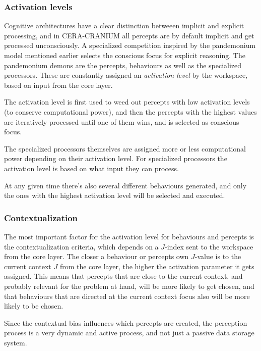 \subsubsection{Activation levels}
Cognitive architectures have a clear distinction betweeen implicit and explicit
processing\cite{atkinson2000consciousness}, and in CERA-CRANIUM all percepts
are by default implicit and get processed unconsciously. A specialized
competition inspired by the pandemonium model mentioned earlier selects the
conscious focus for explicit reasoning. The pandemonium demons are the
percepts, behaviours as well as the specialized processors. These are
constantly assigned an \textit{activation level} by the workspace, based on
input from the core layer.

The activation level is first used to weed out percepts with low activation
levels (to conserve computational power), and then the percepts with the highest
values are iteratively processed until one of them wins, and is selected as
conscious focus.

The specialized processors themselves are assigned more or less computational
power depending on their activation level. For specialized processors the
activation level is based on what input they can process.

At any given time there's also several different behaviours generated, and only
the ones with the highest activation level will be selected and executed.

\subsubsection{Contextualization}
The most important factor for the activation level for behaviours and percepts
is the contextualization criteria, which depends on a $J$-index sent to the
workspace from the core layer. The closer a behaviour or percepts own $J$-value
is to the current context $J$ from the core layer, the higher the activation
parameter it gets assigned. This means that percepts that are close to the
current context, and probably relevant for the problem at hand, will be more
likely to get chosen, and that behaviours that are directed at the current
context focus also will be more likely to be chosen.

Since the contextual bias influences which percepts are created, the perception
process is a very dynamic and active process, and not just a passive data
storage system.

